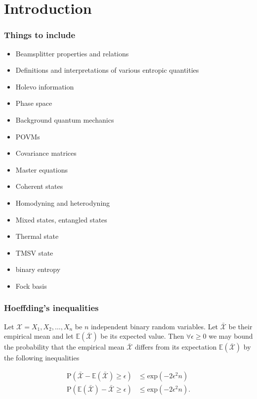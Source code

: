 \chapter{Introduction}

\subsection{Things to include}
\begin{itemize}
\item Beamsplitter properties and relations
\item Definitions and interpretations of various entropic quantities
\item Holevo information
\item Phase space
\item Background quantum mechanics
\item POVMs
\item Covariance matrices
\item Master equations
\item Coherent states
\item Homodyning and heterodyning
\item Mixed states, entangled states
\item Thermal state
\item TMSV state
\item binary entropy
\item Fock basis
\end{itemize}

\subsection{Hoeffding's inequalities}
Let $\mathcal{X} = X_1, X_2, \dots, X_n$ be $n$ independent binary random variables. Let $\bar{\mathcal{X}}$ be their empirical mean  and let $\mathbb{E}\left(\bar{\mathcal{X}}\right)$ be its expected value. Then $\forall \epsilon \ge 0$ we may bound the probability that the empirical mean $\bar{\mathcal{X}}$ differs from its expectation $\mathbb{E}\left(\bar{\mathcal{X}}\right)$ by the following inequalities

\begin{align}
\label{eqn:hoeffding1}
\text{P}\left(\bar{\mathcal{X}} - \mathbb{E}\left(\bar{\mathcal{X}}\right) \ge \epsilon\right) &\le \text{exp}\left(- 2 \epsilon^2 n\right) \\
\label{eqn:hoeffding2}
\text{P}\left(\mathbb{E}\left(\bar{\mathcal{X}}\right) - \bar{\mathcal{X}} \ge \epsilon\right) &\le \text{exp}\left(- 2 \epsilon^2 n\right).
\end{align}

